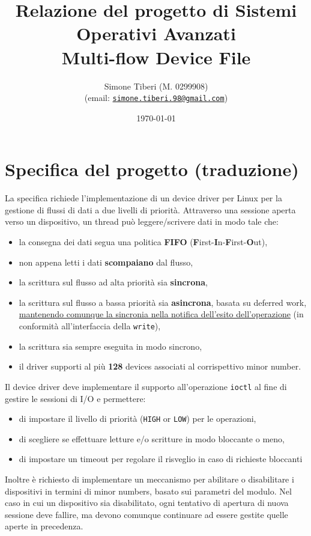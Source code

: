 \documentclass{article}
\title{\small Relazione del progetto di Sistemi Operativi Avanzati \\
\Huge \textbf{Multi-flow Device File}}
\author{Simone Tiberi (M. 0299908)\\%
(email: \texttt{\href{mailto:simone.tiberi.98@gmail.com}{simone.tiberi.98@gmail.com}})}
\date{\today}
\begin{document}
\maketitle

\section*{Specifica del progetto (traduzione)}
La specifica richiede l'implementazione di un device driver per Linux per la gestione di flussi di dati a due livelli di priorità. Attraverso una sessione aperta verso un dispositivo, un thread può leggere/scrivere dati in modo tale che:
\begin{itemize}
        \item la consegna dei dati segua una politica \textbf{FIFO} (\textbf{F}irst-\textbf{I}n-\textbf{F}irst-\textbf{O}ut),
        \item non appena letti i dati \textbf{scompaiano} dal flusso,
        \item la scrittura sul flusso ad alta priorità sia \textbf{sincrona},
        \item la scrittura sul flusso a bassa priorità sia \textbf{asincrona}, basata su deferred work, \ul{mantenendo comunque la sincronia nella notifica dell'esito dell'operazione} (in conformità all'interfaccia della \texttt{write}),
        \item la scrittura sia sempre eseguita in modo sincrono,
        \item il driver supporti al più \textbf{128} devices associati al corrispettivo minor number.
\end{itemize}

Il device driver deve implementare il supporto all'operazione \texttt{ioctl} al fine di gestire le sessioni di I/O e permettere:
\begin{itemize}
        \item di impostare il livello di priorità (\texttt{HIGH} or \texttt{LOW}) per le operazioni,
        \item di scegliere se effettuare letture e/o scritture in modo bloccante o meno,
        \item di impostare un timeout per regolare il risveglio in caso di richieste bloccanti
\end{itemize}

Inoltre è richiesto di implementare un meccanismo per abilitare o disabilitare i dispositivi in termini di minor numbers, basato sui parametri del modulo. Nel caso in cui un dispositivo sia disabilitato, ogni tentativo di apertura di nuova sessione deve fallire, ma devono comunque continuare ad essere gestite quelle aperte in precedenza.
\end{document}
